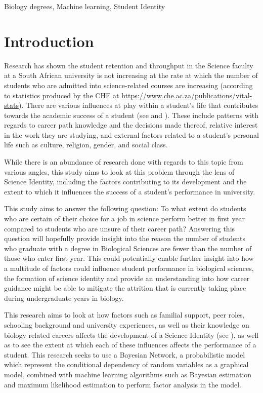 \documentclass[conference]{IEEEtran}
\begin{document}
\begin{IEEEkeywords}
Biology degrees, Machine learning, Student Identity
\end{IEEEkeywords}

\section{Introduction}
Research has shown the student retention and throughput in the Science faculty at a South African university is not increasing at the rate at which the number of students who are admitted into science-related courses are increasing (according to statistics produced by the CHE at \url{https://www.che.ac.za/publications/vital-stats}). There are various influences at play within a student’s life that contributes towards the academic success of a student (see \cite{b1} and \cite{b2}). These include patterns with regards to career path knowledge and the decisions made thereof, relative interest in the work they are studying, and external factors related to a student’s personal life such as culture, religion, gender, and social class.

While there is an abundance of research done with regards to this topic from various angles, this study aims to look at this problem through the lens of Science Identity, including the factors contributing to its development and the extent to which it influences the success of a student's performance in university.

This study aims to answer the following question: To what extent do students who are certain of their choice for a job in science perform better in first year compared to students who are unsure of their career path? Answering this question will hopefully provide insight into the reason the number of students who graduate with a degree in Biological Sciences are fewer than the number of those who enter first year. This could potentially enable further insight into how a multitude of factors could influence student performance in biological sciences, the formation of science identity and provide an understanding into how career guidance might be able to mitigate the attrition that is currently taking place during undergraduate years in biology.

This research aims to look at how factors such as familial support, peer roles, schooling background and university experiences, as well as their knowledge on biology related careers affects the development of a Science Identity (see \cite{b3}), as well as to see the extent at which each of these influences affects the performance of a student. This research seeks to use a Bayesian Network, a probabilistic model which represent the conditional dependency of random variables as a graphical model, combined with machine learning algorithms such as Bayesian estimation and maximum likelihood estimation to perform factor analysis in the model.
\end{document}
